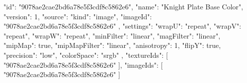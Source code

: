 {
  "id": "9078ae2cae2bd6a78e5f3cdf8c5862e6",
  "name": "Knight Plate Base Color",
  "version": 1,
  "source": {
    "kind": "image",
    "imageId": "9078ae2cae2bd6a78e5f3cdf8c5862e6"
  },
  "settings": {
    "wrapU": "repeat",
    "wrapV": "repeat",
    "wrapW": "repeat",
    "minFilter": "linear",
    "magFilter": "linear",
    "mipMap": true,
    "mipMapFilter": "linear",
    "anisotropy": 1,
    "flipY": true,
    "precision": "low",
    "colorSpace": "srgb"
  },
  "textureIds": [
    "9078ae2cae2bd6a78e5f3cdf8c5862e6"
  ],
  "imageIds": [
    "9078ae2cae2bd6a78e5f3cdf8c5862e6"
  ]
}
